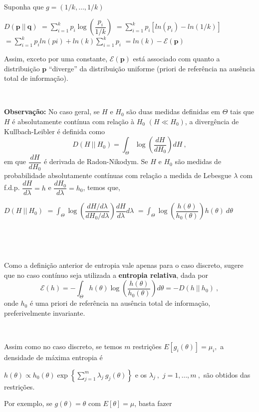 \documentclass[
]{book}
\begin{document}
\(~\)

Suponha que \(g=(1/k,\ldots,1/k)\)

\(D(\boldsymbol{p}~||~\boldsymbol{q})\)
\(=\displaystyle\sum_{i=1}^{k} p_i\log\left(\dfrac{p_i}{1/k}\right)\)
\(=\displaystyle\sum_{i=1}^{k}p_i\left[ln(p_i)-ln(1/k)\right]\)
\(=\displaystyle\sum_{i=1}^kp_i ln(pi)+ln(k)\sum_{i=1}^k p_i\) \(=ln(k)-\mathcal{E}(\boldsymbol p)\)

Assim, exceto por uma constante, \(\mathcal{E}(\boldsymbol p)\) está associado com quanto a distribuição \(\boldsymbol p\) ``diverge'' da distribuição uniforme (priori de referência na ausência total de informação).

\(~\)

\textbf{Observação:} No caso geral, se \(H\) e \(H_0\) são duas medidas definidas em \(\Theta\) tais que \(H\) é absolutamente contínua com relação à \(H_0\) \((H\ll H_0)\), a divergência de Kullbach-Leibler é definida como\\
\[D(H~||~H_0)=\displaystyle\int_\Theta \log\left(\dfrac{dH}{dH_0}\right)dH~,\]
em que \(\dfrac{dH}{dH_0}\) é derivada de Radon-Nikodym. Se \(H\) e \(H_0\) são medidas de probabilidade absolutamente contínuas com relação a medida de Lebesgue \(\lambda\) com f.d.p. \(\dfrac{dH}{d\lambda}=h\) e \(\dfrac{dH_0}{d\lambda}=h_0\), temos que,

\(D(H~||~H_0)\) \(=\displaystyle\int_\Theta \log\left(\dfrac{dH/d\lambda}{dH_0/d\lambda}\right)\dfrac{dH}{d\lambda}d\lambda\)
\(=\displaystyle\int_\Theta \log\left(\dfrac{h(\theta)}{h_0(\theta)}\right)h(\theta)~d\theta\)

\(~\)

\(~\)

Como a definição anterior de entropia vale apenas para o caso discreto, \citet{Jaynes03} sugere que no caso contínuo seja utilizada a \textbf{entropia relativa}, dada por
\[\mathcal{E}(h)=-\displaystyle\int_\Theta h(\theta)\log\left(\dfrac{h(\theta)}{h_0(\theta)}\right)d\theta=-D(h~||~h_0)~,\]
onde \(h_0\) é uma priori de referência na ausência total de informação, preferivelmente invariante.

\(~\)

Assim como no caso discreto, se temos \(m\) restrições \(E[g_i(\theta)]=\mu_i,\) a densidade de máxima entropia é

\(h(\theta)\propto h_0(\theta)\exp\left\{\displaystyle\sum_{j=1}^m\lambda_j~ g_j(\theta)\right\}\) e os \(\lambda_j~,\) \(j=1,\ldots,m~,\) são obtidos das restrições.

Por exemplo, se \(g(\theta)=\theta\) com \(E[\theta]=\mu\), basta fazer
\end{document}
